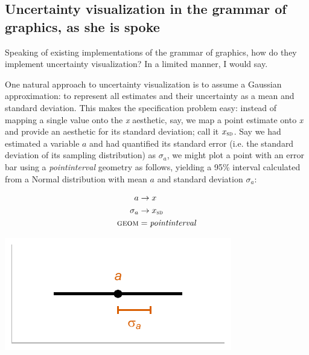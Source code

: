 \documentclass[journal]{vgtc}                     %
\begin{document}
\subsection{Uncertainty visualization in the grammar of graphics, as she is spoke}

Speaking of existing implementations of the grammar of graphics, how do they implement uncertainty visualization? In a limited manner, I would say.

One natural approach to uncertainty visualization is to assume a Gaussian approximation: to represent all estimates and their uncertainty as a mean and standard deviation. This makes the specification problem easy: instead of mapping a single value onto the \textit{x} aesthetic, say, we map a point estimate onto \textit{x} and provide an aesthetic for its standard deviation; call it $x_\textsc{sd}$. Say we had estimated a variable $a$ and had quantified its standard error (i.e. the standard deviation of its sampling distribution) as $\sigma_a$, we might plot a point with an error bar using a \textit{pointinterval} geometry as follows, yielding a 95\% interval calculated from a Normal distribution with mean $a$ and standard deviation $\sigma_a$:

\hfill\break
  \begin{minipage}{.5\columnwidth}
\begin{align*}
a &\rightarrow x\\
\sigma_a &\rightarrow x_\textsc{sd}\\
\textsc{geom} &= \mathit{pointinterval}
\end{align*}
  \end{minipage}%
  \begin{minipage}{.4\columnwidth}
    \centering
    \includegraphics[width=1.2\columnwidth]{figs/2-mean_sd_interval.pdf}
  \end{minipage}
\end{document}
